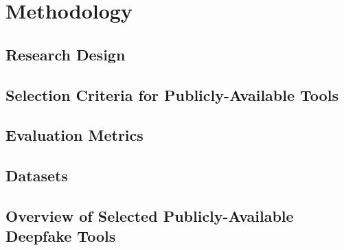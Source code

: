 
\chapter{Methodology}\label{chapter:methodology}

\section{Research Design}\label{chapter:research}
\section{Selection Criteria for Publicly-Available Tools}\label{chapter:selection}
\section{Evaluation Metrics}\label{chapter:evaluation}
\section{Datasets}\label{chapter:data}
\section{Overview of Selected Publicly-Available Deepfake Tools}